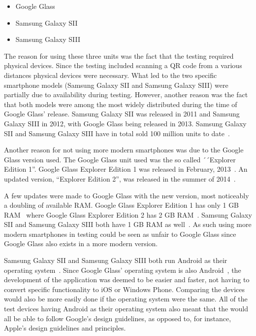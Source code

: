 \begin{itemize}
	\item Google Glass
	\item Samsung Galaxy SII
	\item Samsung Galaxy SIII
\end{itemize}

The reason for using these three units was the fact that the testing required physical devices. Since the testing included scanning a QR code from a various distances physical devices were necessary. What led to the two specific smartphone models (Samsung Galaxy SII and Samsung Galaxy SIII) were partially due to availability during testing. However, another reason was the fact that both models were among the most widely distributed during the time of Google Glass' release. Samsung Galaxy SII was released in 2011 and Samsung Galaxy SIII in 2012, with Google Glass being released in 2013. Samsung Galaxy SII and Samsung Galaxy SIII have in total sold 100 million units to date~\cite{samsungGalaxyS2Sales, samsungGalaxyS3Sales}.

Another reason for not using more modern smartphones was due to the Google Glass version used. The Google Glass unit used was the so called ´´Explorer Edition 1''. Google Glass Explorer Edition 1 was released in February, 2013~\cite{historyOfGlass}. An updated version, ``Explorer Edition 2'', was released in the summer of 2014~\cite{googleGlassEdition2RAM}. 

A few updates were made to Google Glass with the new version, most noticeably a doubling of available RAM. Google Glass Explorer Edition 1 has only 1 GB RAM~\cite{googleGlassEdition1RAM} where Google Glass Explorer Edition 2 has 2 GB RAM~\cite{googleGlassEdition2RAM}. Samsung Galaxy SII and Samsung Galaxy SIII both have 1 GB RAM as well~\cite{samsungGalaxyS2Wiki, samsungGalaxyS3Wiki}. As such using more modern smartphones in testing could be seen as unfair to Google Glass since Google Glass also exists in a more modern version.

Samsung Galaxy SII and Samsung Galaxy SIII both run Android as their operating system~\cite{samsungGalaxyS2Wiki, samsungGalaxyS3Wiki}. Since Google Glass' operating system is also Android~\cite{googleGlassWiki}, the development of the application was deemed to be easier and faster, not having to convert specific functionality to iOS or Windows Phone. Comparing the devices would also be more easily done if the operating system were the same. All of the test devices having Android as their operating system also meant that the would all be able to follow Google's design guidelines, as opposed to, for instance, Apple's design guidelines and principles\cite{iosDesignGuidelines}.

